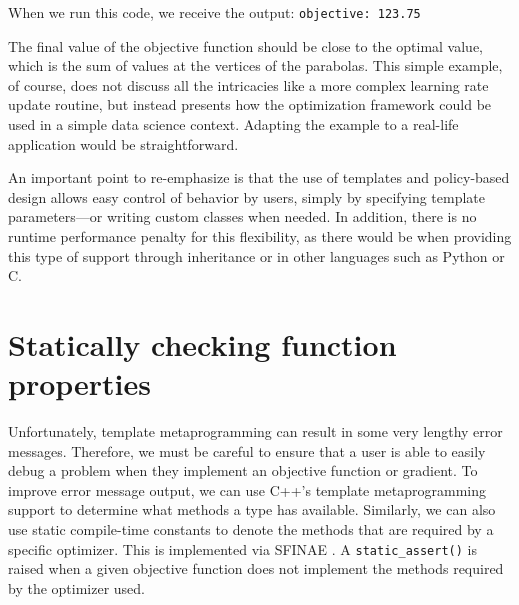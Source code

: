 \documentclass{article}
\begin{document}
When we run this code, we receive the output: {\tt objective: 123.75 }

The final value of the objective function should be close to the optimal value,
which is the sum of values at the vertices of the parabolas.
This simple example, of course, does not discuss all the intricacies like a more
complex learning rate update routine, but instead presents how the optimization
framework could be used in a simple data science context. Adapting the example
to a real-life application would be straightforward.

An important point to re-emphasize is that the use of templates and
policy-based design allows easy control of behavior by users, simply by
specifying template parameters---or writing custom classes when needed.  In
addition, there is no runtime performance penalty for this flexibility, as
there would be when providing this type of support through inheritance or in
other languages such as Python or C.


\vspace*{-0.4em}
\section{Statically checking function properties}
\label{sec:static}
\vspace*{-0.3em}

Unfortunately, template metaprogramming can result in some very lengthy error
messages.  Therefore, we must be careful to ensure that a user is able to easily
debug a problem when they implement an objective function or gradient.  To
 improve error message output, we can use C++'s template metaprogramming
support to determine what methods a type has available.  Similarly, we can also
use static compile-time constants to denote the methods that are required by a
specific optimizer.  This is implemented via SFINAE
\cite{Vandevoorde2002sfinae}.  A {\tt static\_assert()} is raised when a given
objective function does not implement the methods required by the optimizer used.
\end{document}
